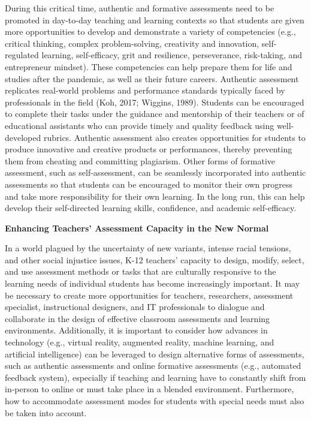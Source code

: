 \documentclass[
]{book}
\begin{document}
During this critical time, authentic and formative assessments need to be promoted in day-to-day teaching and learning contexts so that students are given more opportunities to develop and demonstrate a variety of competencies (e.g., critical thinking, complex problem-solving, creativity and innovation, self-regulated learning, self-efficacy, grit and resilience, perseverance, risk-taking, and entrepreneur mindset). These competencies can help prepare them for life and studies after the pandemic, as well as their future careers. Authentic assessment replicates real-world problems and performance standards typically faced by professionals in the field (Koh, 2017; Wiggins, 1989). Students can be encouraged to complete their tasks under the guidance and mentorship of their teachers or of educational assistants who can provide timely and quality feedback using well-developed rubrics. Authentic assessment also creates opportunities for students to produce innovative and creative products or performances, thereby preventing them from cheating and committing plagiarism. Other forms of formative assessment, such as self-assessment, can be seamlessly incorporated into authentic assessments so that students can be encouraged to monitor their own progress and take more responsibility for their own learning. In the long run, this can help develop their self-directed learning skills, confidence, and academic self-efficacy.

\textbf{Enhancing Teachers' Assessment Capacity in the New Normal}

In a world plagued by the uncertainty of new variants, intense racial tensions, and other social injustice issues, K-12 teachers' capacity to design, modify, select, and use assessment methods or tasks that are culturally responsive to the learning needs of individual students has become increasingly important. It may be necessary to create more opportunities for teachers, researchers, assessment specialist, instructional designers, and IT professionals to dialogue and collaborate in the design of effective classroom assessments and learning environments. Additionally, it is important to consider how advances in technology (e.g., virtual reality, augmented reality, machine learning, and artificial intelligence) can be leveraged to design alternative forms of assessments, such as authentic assessments and online formative assessments (e.g., automated feedback system), especially if teaching and learning have to constantly shift from in-person to online or must take place in a blended environment. Furthermore, how to accommodate assessment modes for students with special needs must also be taken into account.
\end{document}
